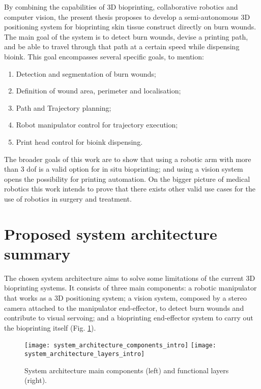 By combining the capabilities of 3D bioprinting, collaborative robotics and computer vision, the present thesis proposes to develop a semi-autonomous 3D positioning system for bioprinting skin tissue construct directly on burn wounds. The main goal of the system is to detect burn wounds, devise a printing path, and be able to travel through that path at a certain speed while dispensing bioink. This goal encompasses several specific goals, to mention:

\begin{enumerate}
    \item Detection and segmentation of burn wounds;
    \item Definition of wound area, perimeter and localisation;
    \item Path and Trajectory planning;
    \item Robot manipulator control for trajectory execution;
    \item Print head control for bioink dispensing.
\end{enumerate}

The broader goals of this work are to show that using a robotic arm with more than 3 \gls{dof} is a valid option for in situ bioprinting; and using a vision system opens the possibility for printing automation. On the bigger picture of medical robotics this work intends to prove that there exists other valid use cases for the use of robotics in surgery and treatment.


\section{Proposed system architecture summary} %
\label{sec:proposed_system_architecture_summary}

The chosen system architecture aims to solve some limitations of the current 3D bioprinting systems. It consists of three main components: a robotic manipulator that works as a 3D positioning system; a vision system, composed by a stereo camera attached to the manipulator end-effector, to detect burn wounds and contribute to visual servoing; and a bioprinting end-effector system to carry out the bioprinting itself (Fig. \ref{fig:system_architecture_intro}).

\begin{figure}[htbp]
	\centering
	\texttt{[image: system\_architecture\_components\_intro]}
	\hspace{0.1in}
	\texttt{[image: system\_architecture\_layers\_intro]}
	\caption[System architecture main components and functional layers.]{System architecture main components (left) and functional layers (right).}
	\label{fig:system_architecture_intro}
\end{figure}

